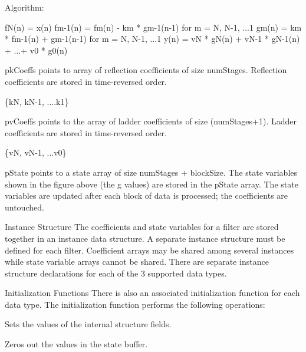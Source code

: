 \begin{DoxyParagraph}{Algorithm\-: }
 
\begin{DoxyPre}   
    fN(n)   =  x(n)   
    fm-1(n) = fm(n) - km * gm-1(n-1)   for m = N, N-1, ...1   
    gm(n)   = km * fm-1(n) + gm-1(n-1) for m = N, N-1, ...1   
    y(n)    = vN * gN(n) + vN-1 * gN-1(n) + ...+ v0 * g0(n)   
 \end{DoxyPre}
 
\end{DoxyParagraph}
\begin{DoxyParagraph}{}
{\ttfamily pk\-Coeffs} points to array of reflection coefficients of size {\ttfamily num\-Stages}. Reflection coefficients are stored in time-\/reversed order. 
\end{DoxyParagraph}
\begin{DoxyParagraph}{}

\begin{DoxyPre}   
    \{kN, kN-1, ....k1\}   
 \end{DoxyPre}
 {\ttfamily pv\-Coeffs} points to the array of ladder coefficients of size {\ttfamily (num\-Stages+1)}. Ladder coefficients are stored in time-\/reversed order. 
\end{DoxyParagraph}
\begin{DoxyParagraph}{}

\begin{DoxyPre}   
    \{vN, vN-1, ...v0\}   
 \end{DoxyPre}
 {\ttfamily p\-State} points to a state array of size {\ttfamily num\-Stages + block\-Size}. The state variables shown in the figure above (the g values) are stored in the {\ttfamily p\-State} array. The state variables are updated after each block of data is processed; the coefficients are untouched. 
\end{DoxyParagraph}
\begin{DoxyParagraph}{Instance Structure }
The coefficients and state variables for a filter are stored together in an instance data structure. A separate instance structure must be defined for each filter. Coefficient arrays may be shared among several instances while state variable arrays cannot be shared. There are separate instance structure declarations for each of the 3 supported data types.
\end{DoxyParagraph}
\begin{DoxyParagraph}{Initialization Functions }
There is also an associated initialization function for each data type. The initialization function performs the following operations\-:
\begin{DoxyItemize}
\item Sets the values of the internal structure fields.
\item Zeros out the values in the state buffer.
\end{DoxyItemize}
\end{DoxyParagraph}

